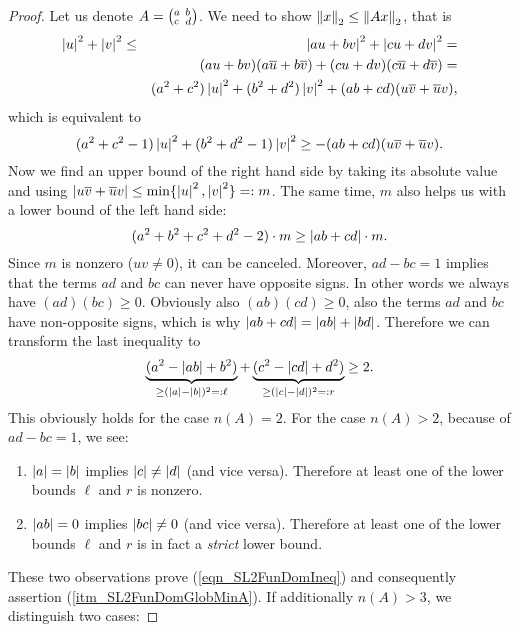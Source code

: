 \begin{proof}
Let us denote $A = \smallmat{a}{b}{c}{d}$. We need to show $\eucnorm{x} \le \eucnorm{Ax}$, that is
\begin{eqnarray*}
\abs{u}^2 + \abs{v}^2 
&\le& \abs{au + bv}^2 + \abs{cu + dv}^2 =\\
&& (au + bv)(a\conj{u} + b\conj{v}) + (cu + dv)(c\conj{u} + d\conj{v}) =\\
&& (a^2 + c^2)\abs{u}^2 + (b^2 + d^2)\abs{v}^2 + (ab + cd)(u\conj{v} + \conj{u}v),
\end{eqnarray*}
which is equivalent to
\begin{equation*}
(a^2 + c^2 - 1)\abs{u}^2 + (b^2 + d^2 - 1)\abs{v}^2 \ge -(ab + cd)(u\conj{v} + \conj{u}v).
\end{equation*}
Now we find an upper bound of the right hand side by taking its absolute value and using $\abs{u\conj{v} + \conj{u}v} \le \min\{\abs{u}^2, \abs{v}^2\} =: m$. The same time, $m$ also helps us with a lower bound of the left hand side:
\begin{equation*}
(a^2 + b^2 + c^2 + d^2 - 2) \cdot m \ge \abs{ab + cd} \cdot m.
\end{equation*}
Since $m$ is nonzero ($uv \ne 0$), it can be canceled. Moreover, $ad - bc = 1$ implies that the terms $ad$ and $bc$ can never have opposite signs. In other words we always have $(ad)(bc) \ge 0$. Obviously also $(ab)(cd) \ge 0$, \ie also the terms $ad$ and $bc$ have non-opposite signs, which is why $\abs{ab + cd} = \abs{ab} + \abs{bd}$. Therefore we can transform the last inequality to
\begin{equation}
\label{eqn_SL2FunDomIneq}
\underbrace{(a^2 - \abs{ab} + b^2)}_{\ge(\abs{a}-\abs{b})^2 =: \ell} + 
\underbrace{(c^2 - \abs{cd} + d^2)}_{\ge(\abs{c}-\abs{d})^2 =: r} \ge 2.
\end{equation}
This obviously holds for the case $n(A) = 2$. For the case $n(A) > 2$, because of $ad - bc = 1$, we see:
\begin{enumerate}[\quad(a)]
\item 
\label{itm_SL2FunDomObsA}
$\abs{a} = \abs{b}$ implies $\abs{c} \ne \abs{d}$ (and vice versa). Therefore at least one of the lower bounds $\ell$ and $r$ is nonzero.
\item 
\label{itm_SL2FunDomObsB}
$\abs{ab} = 0$ implies $\abs{bc} \ne 0$ (and vice versa). Therefore at least one of the lower bounds $\ell$ and $r$ is in fact a \emph{strict} lower bound.
\end{enumerate}
These two observations prove (\ref{eqn_SL2FunDomIneq}) and consequently assertion (\ref{itm_SL2FunDomGlobMinA}). If additionally $n(A) > 3$, we distinguish two cases:

\end{proof}

